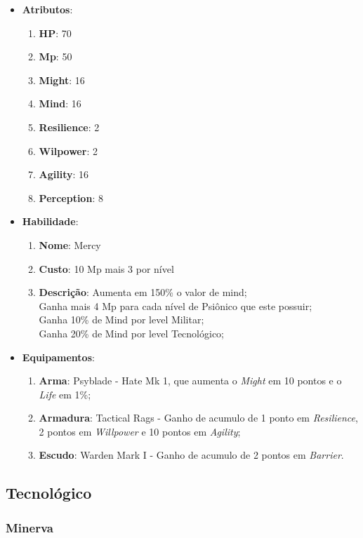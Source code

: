 \documentclass[11pt]{article} %
\begin{document}
\begin{itemize}
\item \textbf{Atributos}:
  \begin{enumerate}
    \item \textbf{HP}: 70
    \item \textbf{Mp}: 50
    \item \textbf{Might}: 16
    \item \textbf{Mind}: 16
    \item \textbf{Resilience}: 2
    \item \textbf{Wilpower}: 2
    \item \textbf{Agility}: 16
    \item \textbf{Perception}: 8
  \end{enumerate}
\item \textbf{Habilidade}:
  \begin{enumerate}
    \item \textbf{Nome}: Mercy
    \item \textbf{Custo}: 10 Mp mais 3 por nível
    \item \textbf{Descrição}: Aumenta em 150\% o valor de mind;\\
    Ganha mais 4 Mp para cada nível de Psiônico que este possuir;\\
    Ganha 10\% de Mind por level Militar;\\
    Ganha 20\% de Mind por level Tecnológico;\\
  \end{enumerate}
\item \textbf{Equipamentos}:
  \begin{enumerate}
    \item \textbf{Arma}: Psyblade - Hate Mk 1, que aumenta o \textit{Might} em 10 pontos e o \textit{Life} em 1\%;
    \item \textbf{Armadura}: Tactical Rags - Ganho de acumulo de 1 ponto em \textit{Resilience}, 2 pontos em \textit{Willpower} e 10 pontos em \textit{Agility};
    \item \textbf{Escudo}: Warden Mark I - Ganho de acumulo de 2 pontos em \textit{Barrier}.
  \end{enumerate}
\end{itemize}

\subsection{Tecnológico}

\subsubsection{Minerva}
\end{document}
